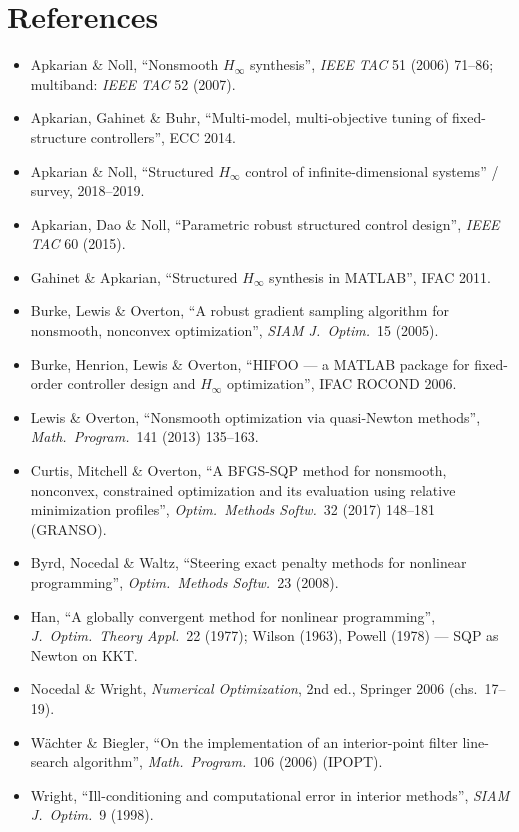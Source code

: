 \documentclass[11pt,a4paper]{article}
\newcommand{\revc}[1]{#1}
\begin{document}
\revc{\section*{References}
\small
\begin{itemize}[leftmargin=1.2em,itemsep=0pt]
\item Apkarian \& Noll, ``Nonsmooth $H_\infty$ synthesis'', \emph{IEEE TAC} 51 (2006) 71--86; multiband: \emph{IEEE TAC} 52 (2007).
\item Apkarian, Gahinet \& Buhr, ``Multi-model, multi-objective tuning of fixed-structure controllers'', ECC 2014.
\item Apkarian \& Noll, ``Structured $H_\infty$ control of infinite-dimensional systems'' / survey, 2018--2019.
\item Apkarian, Dao \& Noll, ``Parametric robust structured control design'', \emph{IEEE TAC} 60 (2015).
\item Gahinet \& Apkarian, ``Structured $H_\infty$ synthesis in MATLAB'', IFAC 2011.
\item Burke, Lewis \& Overton, ``A robust gradient sampling algorithm for nonsmooth, nonconvex optimization'', \emph{SIAM J.\ Optim.}\ 15 (2005).
\item Burke, Henrion, Lewis \& Overton, ``HIFOO --- a MATLAB package for fixed-order controller design and $H_\infty$ optimization'', IFAC ROCOND 2006.
\item Lewis \& Overton, ``Nonsmooth optimization via quasi-Newton methods'', \emph{Math.\ Program.}\ 141 (2013) 135--163.
\item Curtis, Mitchell \& Overton, ``A BFGS-SQP method for nonsmooth, nonconvex, constrained optimization and its evaluation using relative minimization profiles'', \emph{Optim.\ Methods Softw.}\ 32 (2017) 148--181 (GRANSO).
\item Byrd, Nocedal \& Waltz, ``Steering exact penalty methods for nonlinear programming'', \emph{Optim.\ Methods Softw.}\ 23 (2008).
\item Han, ``A globally convergent method for nonlinear programming'', \emph{J.\ Optim.\ Theory Appl.}\ 22 (1977); Wilson (1963), Powell (1978) --- SQP as Newton on KKT.
\item Nocedal \& Wright, \emph{Numerical Optimization}, 2nd ed., Springer 2006 (chs.\ 17--19).
\item W\"achter \& Biegler, ``On the implementation of an interior-point filter line-search algorithm'', \emph{Math.\ Program.}\ 106 (2006) (IPOPT).
\item Wright, ``Ill-conditioning and computational error in interior methods'', \emph{SIAM J.\ Optim.}\ 9 (1998).

\end{itemize}}
\end{document}
